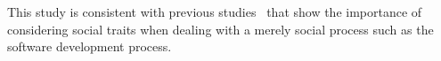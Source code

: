 \documentclass[10pt, conference]{IEEEtran}
\begin{document}
This study is consistent with previous studies~\cite{Yu15,tsay14icse,tsay14fse} that show the importance of considering social traits  when dealing with a merely social process such as the software development process.  



%
%



%
%
\end{document}
